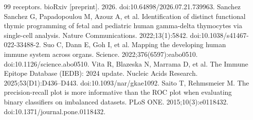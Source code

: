 \documentclass[12pt]{article}
\begin{document}
\begin{thebibliography}{99}
receptors. bioRxiv [preprint]. 2026. doi:10.64898/2026.07.21.739963.
 Sanchez Sanchez G, Papadopoulou M, Azouz A, et al.
Identification of distinct functional thymic programming of fetal and pediatric
human gamma-delta thymocytes via single-cell analysis.
Nature Communications. 2022;13(1):5842. doi:10.1038/s41467-022-33488-2.
 Suo C, Dann E, Goh I, et al.
Mapping the developing human immune system across organs.
Science. 2022;376(6597):eabo0510. doi:10.1126/science.abo0510.
 Vita R, Blazeska N, Marrama D, et al.
The Immune Epitope Database (IEDB): 2024 update.
Nucleic Acids Research. 2025;53(D1):D436--D443. doi:10.1093/nar/gkae1092.
 Saito T, Rehmsmeier M.
The precision-recall plot is more informative than the ROC plot when evaluating
binary classifiers on imbalanced datasets.
PLoS ONE. 2015;10(3):e0118432. doi:10.1371/journal.pone.0118432.
\end{thebibliography}
\end{document}
